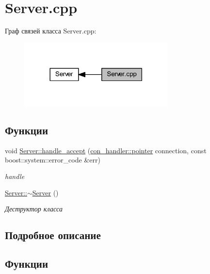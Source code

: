 \hypertarget{group__servercpp}{}\section{Server.\+cpp}
\label{group__servercpp}
Граф связей класса Server.\+cpp\+:
\nopagebreak
\begin{figure}[H]
\begin{center}
\leavevmode
\includegraphics[width=222pt]{group__servercpp}
\end{center}
\end{figure}
\subsection*{Функции}
\begin{DoxyCompactItemize}
\item 
void \mbox{\hyperlink{group__servercpp_gadb53e5d1b7c0ad8a79ce236c8ca5d50c}{Server\+::handle\+\_\+accept}} (\mbox{\hyperlink{classcon__handler_ada4a1b970f9fd8e55460a58cf7f7ce2c}{con\+\_\+handler\+::pointer}} connection, const boost\+::system\+::error\+\_\+code \&err)
\begin{DoxyCompactList}\small\item\em handle \end{DoxyCompactList}\item 
\mbox{\hyperlink{group__servercpp_ga4b3aa2579cb1c8cd1d069582c14d0fa6}{Server\+::$\sim$\+Server}} ()
\begin{DoxyCompactList}\small\item\em Деструктор класса \end{DoxyCompactList}\end{DoxyCompactItemize}


\subsection{Подробное описание}


\subsection{Функции}
\mbox{\label{group__servercpp_gadb53e5d1b7c0ad8a79ce236c8ca5d50c}} 
